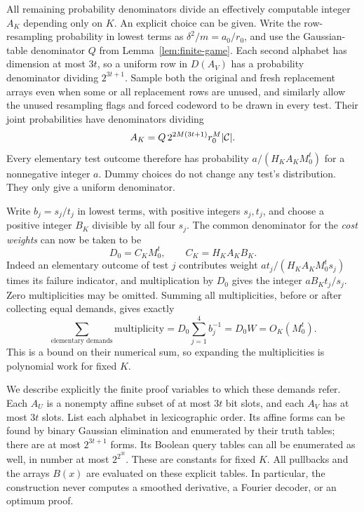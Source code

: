 All remaining probability denominators divide an effectively computable
integer $A_K$ depending only on $K$. An explicit choice can be given.
Write the row-resampling probability in lowest terms as
$\delta^2/m=a_0/r_0$, and use the Gaussian-table denominator $Q$ from
Lemma~\ref{lem:finite-game}. Each second alphabet has dimension at most
$3t$, so a uniform row in $D(A_V)$ has a probability denominator dividing
$2^{3t+1}$. Sample both the original and fresh replacement arrays even
when some or all replacement rows are unused, and similarly allow the
unused resampling flags and forced codeword to be drawn in every test.
Their joint probabilities have denominators dividing
\begin{equation}\label{eq:inner-denominator}
 A_K=Q\,2^{2M(3t+1)}r_0^M|\mathcal C|.
\end{equation}
Every elementary test outcome therefore has probability
$a/(H_K A_K M_0^t)$ for a nonnegative integer $a$. Dummy choices do not
change any test's distribution. They only give a uniform denominator.

Write $b_j=s_j/t_j$ in lowest terms, with positive integers $s_j,t_j$,
and choose a positive integer $B_K$ divisible by all four $s_j$.
The common denominator for the \emph{cost weights} can now be taken to be
\begin{equation}\label{eq:polynomial-denominator}
 D_0=C_KM_0^t,\qquad C_K=H_KA_KB_K.
\end{equation}
Indeed an elementary outcome of test $j$ contributes weight
$a t_j/(H_KA_KM_0^t s_j)$ times its failure indicator, and multiplication
by $D_0$ gives the integer $aB_Kt_j/s_j$. Zero multiplicities may be
omitted. Summing all multiplicities, before or after collecting equal
demands, gives exactly
\begin{equation}\label{eq:total-multiplicity}
 \sum_{\text{elementary demands}}\text{multiplicity}
 =D_0\sum_{j=1}^4b_j^{-1}=D_0W=O_K(M_0^t).
\end{equation}
This is a bound on their numerical sum, so expanding the multiplicities
is polynomial work for fixed $K$.

We describe explicitly the finite proof variables to which these demands
refer. Each $A_U$ is a nonempty affine subset of at most $3t$ bit slots,
and each $A_V$ has at most $3t$ slots. List each alphabet in lexicographic
order. Its affine forms can be found by binary Gaussian elimination and
enumerated by their truth tables; there are at most $2^{3t+1}$ forms.
Its Boolean query tables can all be enumerated as well, in number at
most $2^{2^{3t}}$. These are constants for fixed $K$. All pullbacks and
the arrays $B(x)$ are evaluated on these explicit tables. In particular,
the construction never computes a smoothed derivative, a Fourier decoder,
or an optimum proof.

